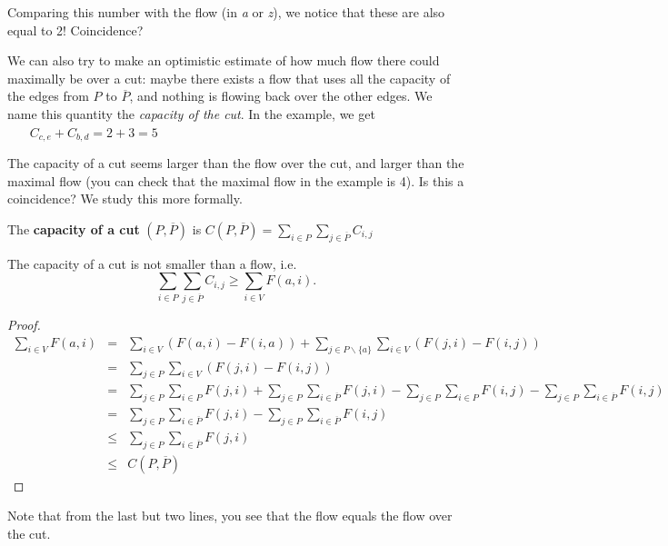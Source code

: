 Comparing this number with the flow (in {\em a} or {\em z}), we notice
that these are also equal to 2! Coincidence?

We can also try to make an optimistic estimate of how much flow there
could maximally be over a cut: maybe there exists a flow that uses all
the capacity of the edges from $P$ to $\overline{P}$, and nothing is
flowing back over the other edges. We name this quantity the {\em
capacity of the cut}. In the example, we get \mbox{$~~~~~~~~C_{c,e} +
C_{b,d} = 2+3=5$}

The capacity of a cut seems larger than the flow over the cut, and
larger than the maximal flow (you can check that the maximal flow in
the example is 4). Is this a coincidence? We study this more formally.


 \begin{definition}
  \textup{The \textbf{capacity of a cut} $(P,\overline{P})$ is
    $C(P,\overline{P}) = \displaystyle
    \sum_{i \in P} \sum_{j \in \overline{P}} C_{i,j}$}
\end{definition}

 \begin{theorem} \label{snedeflow}
The capacity of a cut is not smaller than a flow, i.e.
\[\sum_{i \in P} \sum_{j \in \overline{P}} C_{i,j} \geq \sum_{i \in V} F(a,i).\]
\end{theorem}
\begin{proof}
\begin{eqnarray*}
\sum_{i \in V} F(a,i) & = &
                \sum_{i \in V}(F(a,i) - F(i,a)) +
                \sum_{j \in P \backslash \{a\}} \sum_{i \in V}(F(j,i) - F(i,j))\\
        & = & \sum_{j \in P} \sum_{i \in V} (F(j,i) - F(i,j)) \\
        & = & \sum_{j \in P} \sum_{i \in P} F(j,i) +
                \sum_{j \in P} \sum_{i \in \overline{P}} F(j,i) -
                \sum_{j \in P} \sum_{i \in P} F(i,j) -
                \sum_{j \in P} \sum_{i \in \overline{P}} F(i,j)\\
        & = & \sum_{j \in P} \sum_{i \in \overline{P}} F(j,i) -
                \sum_{j \in P} \sum_{i \in \overline{P}} F(i,j)\\
        & \leq & \sum_{j \in P} \sum_{i \in \overline{P}} F(j,i)\\
        & \leq & C(P,\overline{P})
\end{eqnarray*}
\end{proof}

Note that from the last but two lines, you see that the flow equals
the flow over the cut.



